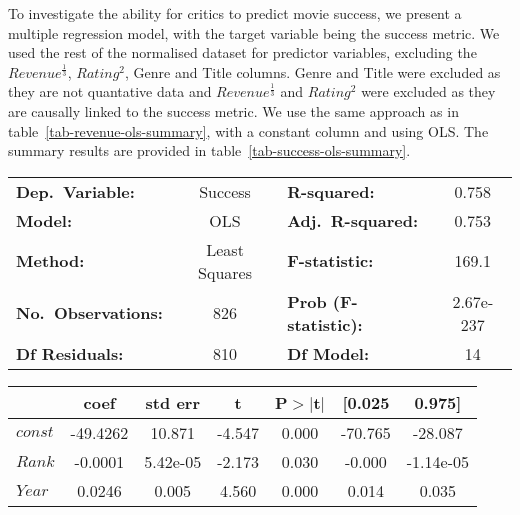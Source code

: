             To investigate the ability for critics to predict movie success, we present a
                multiple regression model, with the target variable being the success metric.
            We used the rest of the normalised dataset for predictor variables, excluding
                the $Revenue^\frac{1}{3}$, $Rating^2$, Genre and Title columns.
            Genre and Title were excluded as they are not quantative data and
                $Revenue^\frac{1}{3}$ and $Rating^2$ were excluded as they are causally linked
                to the success metric.
            We use the same approach as in table~\ref{tab-revenue-ols-summary}, with a
                constant column and using OLS.
            The summary results are provided in table~\ref{tab-success-ols-summary}.
            \begin{table}[H]
            \begin{center}
                \begin{tabular}{lclc}
                    \toprule
                    \textbf{Dep.~Variable:}    & Success       & \textbf{  R-squared:         } & 0.758     \\
                    \textbf{Model:}            & OLS           & \textbf{  Adj.~R-squared:    } & 0.753     \\
                    \textbf{Method:}           & Least Squares & \textbf{  F-statistic:       } & 169.1     \\
                    \textbf{No.~Observations:} & 826           & \textbf{  Prob (F-statistic):} & 2.67e-237 \\
                    \textbf{Df Residuals:}     & 810           & \textbf{Df Model:}             & 14        \\
                    \bottomrule
                \end{tabular}
                \begin{tabular}{lcccccc}
                                                    & \textbf{coef} & \textbf{std err} & \textbf{t} & \textbf{P$> |$t$|$} & \textbf{[0.025} & \textbf{0.975]} \\
                    \midrule
                    \textbf{$const$}                & -49.4262      & 10.871           & -4.547     & 0.000               & -70.765         & -28.087         \\
                    \textbf{$Rank$}                 & -0.0001       & 5.42e-05         & -2.173     & 0.030               & -0.000          & -1.14e-05       \\
                    \textbf{$Year$}                 & 0.0246        & 0.005            & 4.560      & 0.000               & 0.014           & 0.035           \\

\end{tabular}
\end{center}
\end{table}
